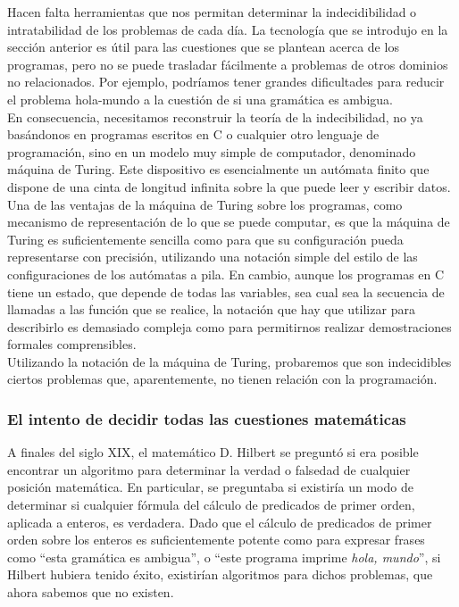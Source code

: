 Hacen falta herramientas que nos permitan determinar la indecidibilidad  o intratabilidad de los problemas de cada día. La tecnología que se introdujo en la sección anterior es útil para las cuestiones que se plantean acerca de los programas, pero no se puede trasladar fácilmente a problemas de otros dominios no relacionados. Por ejemplo, podríamos tener grandes dificultades para reducir el problema hola-mundo a la cuestión de si una gramática es ambigua.\\

En consecuencia, necesitamos reconstruir la teoría de la indecibilidad, no ya basándonos en programas escritos en C o cualquier otro lenguaje de programación, sino en un modelo muy simple de computador, denominado máquina de Turing. Este dispositivo es esencialmente un autómata finito que dispone de una cinta de longitud infinita sobre la que puede leer y escribir datos. Una de las ventajas de la máquina de Turing sobre los programas, como mecanismo de representación de lo que se puede computar, es que la máquina de Turing es suficientemente sencilla como para que su configuración pueda representarse con precisión, utilizando una notación simple del estilo de las configuraciones de los autómatas a pila. En cambio, aunque los programas en C tiene un estado, que depende de todas las variables, sea cual sea la secuencia de llamadas a las función que se realice, la notación que hay que utilizar para describirlo es demasiado compleja como para permitirnos realizar demostraciones formales comprensibles.\\

Utilizando la notación de la máquina de Turing, probaremos que son indecidibles ciertos problemas que, aparentemente, no tienen relación con la programación.\\

\subsubsection{El intento de decidir todas las cuestiones matemáticas}

A finales del siglo XIX, el matemático D. Hilbert se preguntó si era posible encontrar un algoritmo para determinar la verdad o falsedad de cualquier posición matemática. En particular, se preguntaba si existiría un modo de determinar si cualquier fórmula del cálculo de predicados de primer orden, aplicada a enteros, es verdadera. Dado que el cálculo de predicados de primer orden sobre los enteros es suficientemente potente como para expresar frases como ``esta gramática es ambigua'', o ``este programa imprime \emph{hola, mundo}'', si Hilbert hubiera tenido éxito, existirían algoritmos para dichos problemas, que ahora sabemos que no existen.\\

